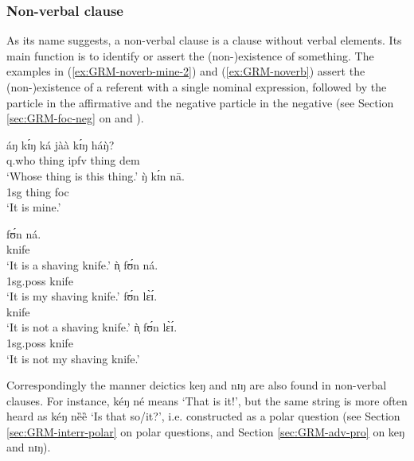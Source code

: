 \z 
 \z

\subsubsection{Non-verbal clause}
\label{sec:GRM-noverb}

As its name suggests, a non-verbal clause is a clause without verbal elements. 
Its
main function is to identify or assert the (non-)existence of 
something.  The examples in (\ref{ex:GRM-noverb-mine-2}) and (\ref{ex:GRM-noverb}) assert 
the (non-)existence
of a
referent with a single nominal expression, followed by the  particle in
the affirmative and the negative particle in the negative (see Section
\ref{sec:GRM-foc-neg} on  and ). 


\ea\label{ex:GRM-noverb-mine}
 \ea\label{ex:GRM-noverb-mine-1}
\gll áŋ kɪ́ŋ ká jàà kɪ́ŋ háŋ̀?\\
{\sc q.}who thing {\sc ipfv} {\ident} thing {\sc dem}\\
\glt `Whose thing is this thing.'
 \ex\label{ex:GRM-noverb-mine-2}
 \gll ŋ̀ kɪ́n nā.\\
{\sc 1sg} thing {\sc foc}\\
\glt `It is mine.'
\z 
 \z


\begin{multicols}{2}
\ea\label{ex:GRM-noverb}
 \ea\label{ex:GRM-noverb-aff-1}
\gll fʊ́n ná.\\
knife {\foc}\\
\glt `It is a shaving knife.'
 \ex\label{ex:GRM-noverb-aff-poss}
\gll ǹ̩ fʊ́n ná.\\
{\sc 1sg.poss} knife {\foc}\\
 \glt `It is my shaving knife.'
 \ex\label{ex:GRM-noverb-neg-1}
\gll fʊ́n lɛ̀ɪ́.\\
knife {\neg}\\
 \glt `It is not a shaving knife.'
 \ex\label{ex:GRM-noverb-neg-poss}
\gll ǹ̩  fʊ́n lɛ̀ɪ́.\\
{\sc 1sg.poss} knife {\neg}\\
 \glt `It is not my shaving knife.'

\z 
 \z
\end{multicols}

Correspondingly the manner deictics {\sls keŋ} and {\sls  nɪŋ} are also found in non-verbal clauses. 
For instance, {\sls kéŋ né} means `That is it!', but the same string is more often heard as {\sls 
kéŋ nȅȅ} `Is that so/it?',  i.e. constructed  as a polar question (see Section 
\ref{sec:GRM-interr-polar} on polar questions, and Section \ref{sec:GRM-adv-pro}  on  {\sls keŋ} 
and 
{\sls  nɪŋ}).

